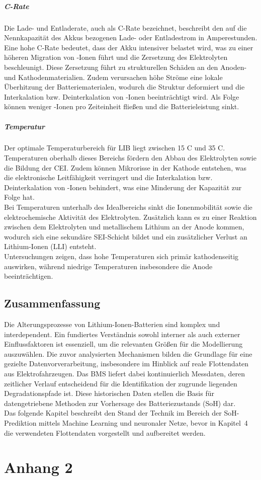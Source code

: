 \paragraph{C-Rate} Die Lade- und Entladerate, auch als C-Rate bezeichnet, beschreibt den auf die Nennkapazität des Akkus bezogenen Lade- oder Entladestrom in Amperestunden. Eine hohe C-Rate bedeutet, dass der Akku intensiver belastet wird, was zu einer höheren Migration von -Ionen führt und die Zersetzung des Elektrolyten beschleunigt. Diese Zersetzung führt zu strukturellen Schäden an den Anoden- und Kathodenmaterialien. Zudem verursachen höhe Ströme eine lokale Überhitzung der Batteriematerialen, wodurch die Struktur deformiert und die Interkalation bzw. Deinterkalation von -Ionen beeinträchtigt wird. Als Folge können weniger -Ionen pro Zeiteinheit fließen und die Batterieleistung sinkt.

\paragraph{Temperatur} Der optimale Temperaturbereich für \acs{LIB} liegt zwischen 15 \textdegree C und 35 \textdegree C. Temperaturen oberhalb dieses Bereichs fördern den Abbau des Elektrolyten sowie die Bildung der \acs{CEI}. Zudem können Mikrorisse in der Kathode entstehen, was die elektronische Leitfähigkeit verringert und die Interkalation bzw. Deinterkalation von -Ionen behindert, was eine Minderung der Kapazität zur Folge hat.\\
Bei Temperaturen unterhalb des Idealbereichs sinkt die Ionenmobilität sowie die elektrochemische Aktivität des Elektrolyten. Zusätzlich kann es zu einer Reaktion zwischen dem Elektrolyten und metallischem Lithium an der Anode kommen, wodurch sich eine sekundäre \acs{SEI}-Schicht bildet und ein zusätzlicher Verlust an Lithium-Ionen (LLI) entsteht.\\
Untersuchungen zeigen, dass hohe Temperaturen sich primär kathodenseitig auswirken, während niedrige Temperaturen insbesondere die Anode beeinträchtigen.

\section{Zusammenfassung}

Die Alterungsprozesse von Lithium-Ionen-Batterien sind komplex und interdependent. Ein fundiertes Verständnis sowohl interner als auch externer Einflussfaktoren ist essenziell, um die relevanten Größen für die Modellierung auszuwählen. Die zuvor analysierten Mechanismen bilden die Grundlage für eine gezielte Datenvorverarbeitung, insbesondere im Hinblick auf reale Flottendaten aus Elektrofahrzeugen. Das \acs{BMS} liefert dabei kontinuierlich Messdaten, deren zeitlicher Verlauf entscheidend für die Identifikation der zugrunde liegenden Degradationspfade ist. Diese historischen Daten stellen die Basis für datengetriebene Methoden zur Vorhersage des Batteriezustands (\ac{SoH}) dar.\\
Das folgende Kapitel beschreibt den Stand der Technik im Bereich der \acs{SoH}-Prediktion mittels Machine Learning und neuronaler Netze, bevor in Kapitel~4 die verwendeten Flottendaten vorgestellt und aufbereitet werden.

\chapter{Anhang 2}
\label{apx:2}
